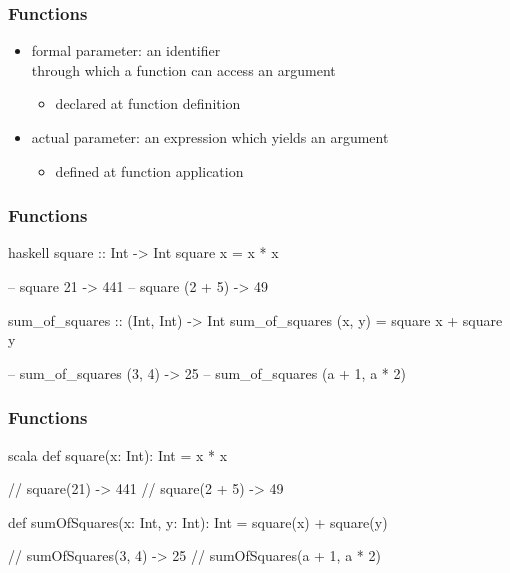 \documentclass[dvipsnames]{beamer}
\theoremstyle{plain}
\begin{document}
\begin{frame}
  \frametitle{Functions}

  \begin{itemize}
    \item \alert{formal parameter}: an identifier\\
      through which a function can access an argument
    \begin{itemize}
      \item declared at function definition
    \end{itemize}

    \pause
    \medskip
    \item \alert{actual parameter}: an expression which yields an argument
    \begin{itemize}
      \item defined at function application
    \end{itemize}
  \end{itemize}
\end{frame}

\begin{frame}[fragile]
  \frametitle{Functions}

  \begin{example}[Haskell]
    \begin{pygments}{haskell}
square :: Int -> Int
square x = x * x

-- square 21 -> 441
-- square (2 + 5) -> 49

sum_of_squares :: (Int, Int) -> Int
sum_of_squares (x, y) = square x + square y

-- sum_of_squares (3, 4) -> 25
-- sum_of_squares (a + 1, a * 2)
    \end{pygments}
  \end{example}
\end{frame}

\begin{frame}[fragile]
  \frametitle{Functions}

  \begin{example}[Scala]
    \begin{pygments}{scala}
def square(x: Int): Int = x * x

// square(21) -> 441
// square(2 + 5) -> 49

def sumOfSquares(x: Int, y: Int): Int =
    square(x) + square(y)

// sumOfSquares(3, 4) -> 25
// sumOfSquares(a + 1, a * 2)
    \end{pygments}
  \end{example}
\end{frame}
\end{document}
